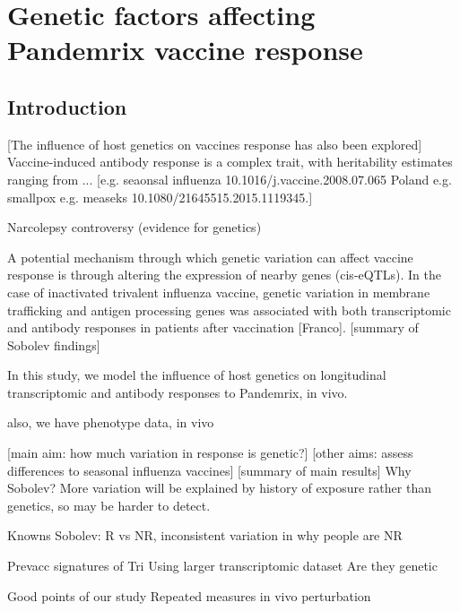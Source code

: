 %
%

\chapter{Genetic factors affecting Pandemrix vaccine response}

\section{Introduction}


[The influence of host genetics on vaccines response has also been explored]
Vaccine-induced antibody response is a complex trait, with heritability estimates ranging from ... [e.g. seaonsal influenza 10.1016/j.vaccine.2008.07.065 Poland e.g. smallpox e.g. measeks 10.1080/21645515.2015.1119345.]

Narcolepsy controversy (evidence for genetics)

A potential mechanism through which genetic variation can affect vaccine response is through altering the expression of nearby genes (cis-eQTLs).
In the case of inactivated trivalent influenza vaccine, genetic variation in membrane trafficking and antigen processing genes was associated with both transcriptomic and antibody responses in patients after vaccination [Franco].
[summary of Sobolev findings]


In this study, we model the influence of host genetics on longitudinal transcriptomic and antibody responses to Pandemrix, in vivo.

also, we have phenotype data, in vivo

[main aim: how much variation in response is genetic?]
[other aims: assess differences to seasonal influenza vaccines]
[summary of main results]
Why Sobolev?
More variation will be explained by history of exposure rather than genetics, so may be harder to detect.

Knowns
    Sobolev: R vs NR, 
    inconsistent variation in why people are NR

Prevacc signatures of Tri
Using larger transcriptomic dataset
Are they genetic

Good points of our study
    Repeated measures
    in vivo perturbation

